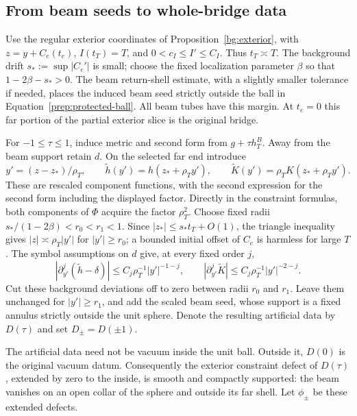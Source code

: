 \subsection{From beam seeds to whole-bridge data}

Use the regular exterior coordinates of Proposition~\ref{bg:exterior},
with $z=y+C_e(t_e)$, $I(t_T)=T$, and
$0<c_I\le I'\le C_I$.  Thus $t_T\asymp T$.  The background drift
$s_*:=\sup|C_e'|$ is small; choose the fixed localization parameter
$\beta$ so that $1-2\beta-s_*>0$.  The beam return-shell estimate,
with a slightly smaller tolerance if needed, places the induced
beam seed strictly outside the ball in
Equation~\eqref{prep:protected-ball}.  All beam tubes have this
margin.  At $t_e=0$ this far portion of the partial exterior slice
is the original bridge.

For $-1\le\tau\le1$, induce metric and second form from
$g+\tau h_T^B$.  Away from the beam support retain $d$.  On the
selected far end introduce
\begin{equation}\label{prep:rescaling}
 y'=(z-z_*)/\rho_T,\qquad
 \widetilde h(y')=h(z_*+\rho_Ty'),\qquad
 \widetilde K(y')=\rho_T K(z_*+\rho_Ty').
\end{equation}
These are rescaled component functions, with the second expression
for the second form including the displayed factor.  Directly in
the constraint formulas, both components of $\Phi$ acquire the
factor $\rho_T^2$.  Choose fixed radii
$s_* /(1-2\beta)<r_0<r_1<1$.  Since
$|z_*|\le s_*t_T+O(1)$, the triangle inequality gives
$|z|\asymp\rho_T|y'|$ for $|y'|\ge r_0$; a bounded initial offset
of $C_e$ is harmless for large $T$.  The symbol assumptions on $d$
give, at every fixed order $j$,
\[
 |\partial_{y'}^j(\widetilde h-\delta)|
 \le C_j\rho_T^{-1}|y'|^{-1-j},\qquad
 |\partial_{y'}^j\widetilde K|
 \le C_j\rho_T^{-1}|y'|^{-2-j}.
\]
Cut these background deviations off to zero between radii $r_0$
and $r_1$.  Leave them unchanged for $|y'|\ge r_1$, and add the
scaled beam seed, whose support is a fixed annulus strictly outside
the unit sphere.  Denote the resulting artificial data by $D(\tau)$
and set $D_\pm=D(\pm1)$.

The artificial data need not be vacuum inside the unit ball.
Outside it, $D(0)$ is the original vacuum datum.  Consequently
the exterior constraint defect of $D(\tau)$, extended by zero to
the inside, is smooth and compactly supported: the beam vanishes
on an open collar of the sphere and outside its far shell.  Let
$\phi_\pm$ be these extended defects.

